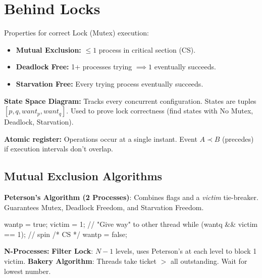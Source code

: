 \section{Behind Locks}

Properties for correct Lock (Mutex) execution:
\begin{itemize}
    \item \textbf{Mutual Exclusion:} $\le 1$ process in critical section (CS).
    \item \textbf{Deadlock Free:} 1+ processes trying $\implies 1$ eventually succeeds.
    \item \textbf{Starvation Free:} Every trying process eventually succeeds.
\end{itemize}

\begin{definition}
    \textbf{State Space Diagram:} Tracks every concurrent configuration. States are tuples $[p, q, want_p, want_q]$. Used to prove lock correctness (find states with No Mutex, Deadlock, Starvation).
\end{definition}

\begin{definition}
    \textbf{Atomic register:} Operations occur at a single instant. Event $A \prec B$ (precedes) if execution intervals don't overlap.
\end{definition}

\subsection{Mutual Exclusion Algorithms}

\textbf{Peterson's Algorithm (2 Processes)}:
Combines flags and a \textit{victim} tie-breaker. Guarantees Mutex, Deadlock Freedom, and Starvation Freedom.
\begin{codeexample}
wantp = true;
victim = 1; // "Give way" to other thread
while (wantq && victim == 1); // spin
/* CS */ wantp = false;
\end{codeexample}

\begin{remark}
    \textbf{N-Processes:}
    \textbf{Filter Lock}: $N-1$ levels, uses Peterson's at each level to block 1 victim.
    \textbf{Bakery Algorithm}: Threads take ticket $> $ all outstanding. Wait for lowest number.
\end{remark}
